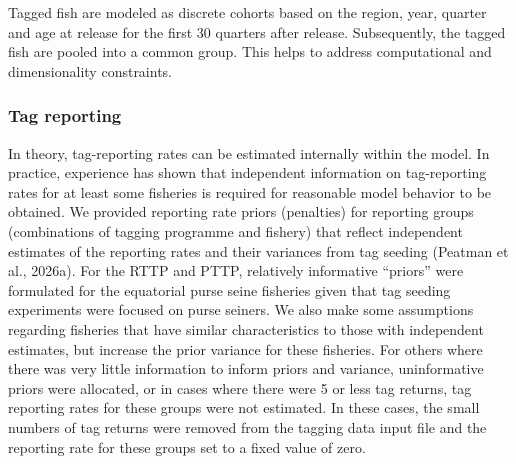 \documentclass[
  english,
  a4paper,
  a4paper,
  11pt]{SCreport}
\begin{document}
Tagged fish are modeled as discrete cohorts based on the region, year,
quarter and age at release for the first 30 quarters after release.
Subsequently, the tagged fish are pooled into a common group. This helps
to address computational and dimensionality constraints.

\subsubsection{Tag reporting}\label{sec-reporting-rate}

In theory, tag-reporting rates can be estimated internally within the
model. In practice, experience has shown that independent information on
tag-reporting rates for at least some fisheries is required for
reasonable model behavior to be obtained. We provided reporting rate
priors (penalties) for reporting groups (combinations of tagging
programme and fishery) that reflect independent estimates of the
reporting rates and their variances from tag seeding (Peatman et al.,
2026a). For the RTTP and PTTP, relatively informative ``priors'' were
formulated for the equatorial purse seine fisheries given that tag
seeding experiments were focused on purse seiners. We also make some
assumptions regarding fisheries that have similar characteristics to
those with independent estimates, but increase the prior variance for
these fisheries. For others where there was very little information to
inform priors and variance, uninformative priors were allocated, or in
cases where there were 5 or less tag returns, tag reporting rates for
these groups were not estimated. In these cases, the small numbers of
tag returns were removed from the tagging data input file and the
reporting rate for these groups set to a fixed value of zero.
\end{document}
